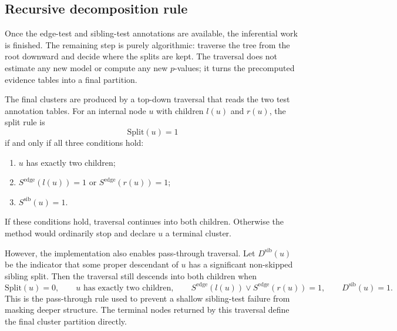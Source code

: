 \subsection{Recursive decomposition rule}

Once the edge-test and sibling-test annotations are available, the inferential
work is finished. The remaining step is purely algorithmic: traverse the tree
from the root downward and decide where the splits are kept. The traversal does
not estimate any new model or compute any new $p$-values; it turns the
precomputed evidence tables into a final partition.

The final clusters are produced by a top-down traversal that reads the two test
annotation tables. For an internal node $u$ with children $l(u)$ and $r(u)$,
the split rule is
\begin{equation}
\mathrm{Split}(u) = 1
\end{equation}
if and only if all three conditions hold:
\begin{enumerate}[leftmargin=1.5em]
  \item $u$ has exactly two children;
  \item $S^{\mathrm{edge}}(l(u)) = 1$ or $S^{\mathrm{edge}}(r(u)) = 1$;
  \item $S^{\mathrm{sib}}(u) = 1$.
\end{enumerate}
If these conditions hold, traversal continues into both children. Otherwise the
method would ordinarily stop and declare $u$ a terminal cluster.

However, the implementation also enables pass-through traversal. Let
$D^{\mathrm{sib}}(u)$ be the indicator that some proper descendant of $u$ has a
significant non-skipped sibling split. Then the traversal still descends into
both children when
\begin{equation}
\mathrm{Split}(u) = 0,
\qquad
u \text{ has exactly two children},
\qquad
S^{\mathrm{edge}}(l(u)) \vee S^{\mathrm{edge}}(r(u)) = 1,
\qquad
D^{\mathrm{sib}}(u) = 1.
\end{equation}
This is the pass-through rule used to prevent a shallow sibling-test failure from
masking deeper structure. The terminal nodes returned by this traversal define
the final cluster partition directly.
